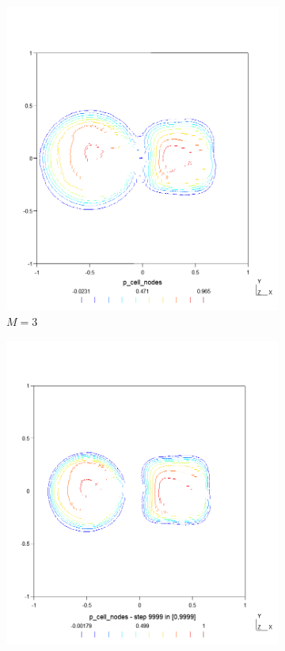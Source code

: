 \begin{figure}[p!]
\begin{subfigure}{.5\textwidth}
        \includegraphics[width=\linewidth]{../figs/sols/kriv-sol-h3600o03}
        \caption{$M = 3$}
    \end{subfigure}
    \begin{subfigure}{.5\textwidth}	
        \centering	
        \includegraphics[width=\linewidth]{../figs/sols/kriv-sol-h6400o02}

\end{subfigure}
\end{figure}
